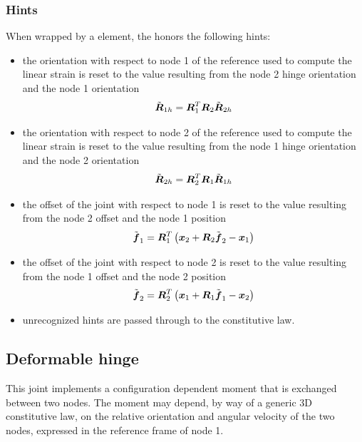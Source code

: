 \subsubsection{Hints}
When wrapped by a  element, the 
honors the following hints:
\begin{itemize}
\item {} the orientation with respect to node 1
of the reference used to compute the linear strain is reset
to the value resulting from the node 2 hinge orientation
and the node 1 orientation
\begin{displaymath}
	\tilde{\boldsymbol{R}}_{1h} = \boldsymbol{R}_1^T \boldsymbol{R}_2 \tilde{\boldsymbol{R}}_{2h}
\end{displaymath}
\item {} the orientation with respect to node 2
of the reference used to compute the linear strain is reset
to the value resulting from the node 1 hinge orientation
and the node 2 orientation
\begin{displaymath}
	\tilde{\boldsymbol{R}}_{2h} = \boldsymbol{R}_2^T \boldsymbol{R}_1 \tilde{\boldsymbol{R}}_{1h}
\end{displaymath}
\item {} the offset of the joint
with respect to node 1 is reset to the value resulting 
from the node 2 offset and the node 1 position
\begin{displaymath}
	\tilde{\boldsymbol{f}}_1 = \boldsymbol{R}_1^T \left( 
		\boldsymbol{x}_2
		+ \boldsymbol{R}_2 \tilde{\boldsymbol{f}}_2
		- \boldsymbol{x}_1
	 \right)
\end{displaymath}
\item {} the offset of the joint
with respect to node 2 is reset to the value resulting 
from the node 1 offset and the node 2 position
\begin{displaymath}
	\tilde{\boldsymbol{f}}_2 = \boldsymbol{R}_2^T \left( 
		\boldsymbol{x}_1
		+ \boldsymbol{R}_1 \tilde{\boldsymbol{f}}_1
		- \boldsymbol{x}_2
	 \right)
\end{displaymath}
\item unrecognized hints are passed through to the constitutive law.
\end{itemize}




\subsection{Deformable hinge}
\label{sec:EL:JOINT:DEFORMABLEHINGE}
This joint implements a configuration dependent moment that is exchanged
between two nodes.
The moment may depend, by way of a generic 3D constitutive law, 
on the relative orientation and angular velocity of the two nodes, 
expressed in the reference frame of node 1.

